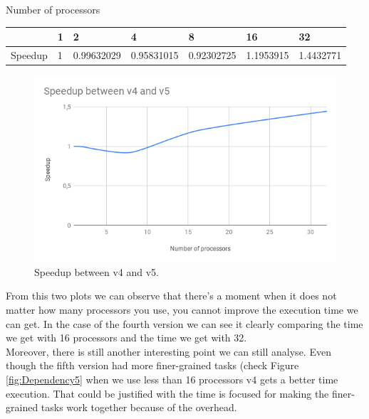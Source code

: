 \documentclass[12]{article}
\begin{document}
\begin{table}[h]
\begin{center}
Number of processors 
\end{center}
\begin{tabular}{l|l|l|l|l|l|l|}
\cline{2-7}
                              & 1 & 2              & 4              & 8              & 16            & 32            \\ \hline
\multicolumn{1}{|l|}{Speedup} & 1 & 0.99632029 & 0.95831015 & 0.92302725 & 1.1953915 & 1.4432771 \\ \hline
\end{tabular}
\end{table}


\begin{figure}[H]
\centering  \includegraphics[width=\linewidth]{images/Speedup.png}
  \caption{Speedup between v4 and v5.}
  \label{fig:PlotComparison}
\end{figure}


From this two plots we can observe that there's a moment when it does not matter how many processors you use, you cannot improve the execution time we can get. In the case of the fourth version we can see it clearly comparing the time we get with 16 processors and the time we get with 32. \\

Moreover, there is still another interesting point we can still analyse. Even though the fifth version had more finer-grained tasks (check Figure \ref{fig:Dependency5} when we use less than 16 processors v4 gets a better time execution. That could be justified with the time is focused for making the finer-grained tasks work together because of the overhead.  
\end{document}
